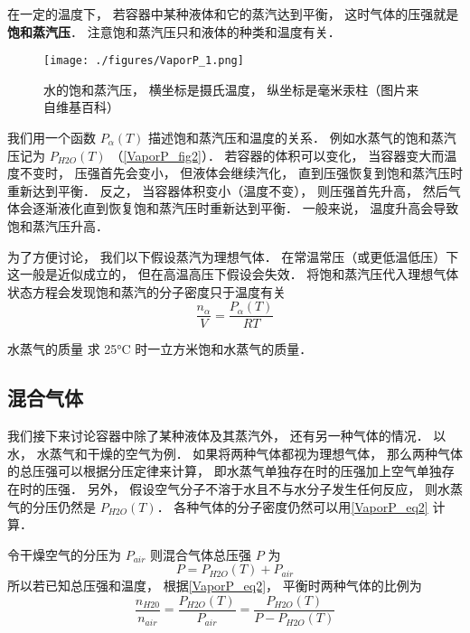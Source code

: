 

在一定的温度下， 若容器中某种液体和它的蒸汽达到平衡， 这时气体的压强就是\textbf{饱和蒸汽压}． 注意饱和蒸汽压只和液体的种类和温度有关．

\begin{figure}[ht]
\centering
\texttt{[image: ./figures/VaporP\_1.png]}
\caption{水的饱和蒸汽压， 横坐标是摄氏温度， 纵坐标是毫米汞柱（图片来自维基百科）} \label{VaporP_fig2}
\end{figure}

我们用一个函数 $P_\alpha(T)$ 描述饱和蒸汽压和温度的关系． 例如水蒸气的饱和蒸汽压记为 $P_{H2O}(T)$ （\autoref{VaporP_fig2}）． 若容器的体积可以变化， 当容器变大而温度不变时， 压强首先会变小， 但液体会继续汽化， 直到压强恢复到饱和蒸汽压时重新达到平衡． 反之， 当容器体积变小（温度不变）， 则压强首先升高，  然后气体会逐渐液化直到恢复饱和蒸汽压时重新达到平衡． 一般来说， 温度升高会导致饱和蒸汽压升高．

为了方便讨论， 我们以下假设蒸汽为理想气体． 在常温常压（或更低温低压）下这一般是近似成立的， 但在高温高压下假设会失效． 将饱和蒸汽压代入理想气体状态方程会发现饱和蒸汽的分子密度只于温度有关
\begin{equation}\label{VaporP_eq2}
\frac{n_\alpha}{V}  = \frac{P_\alpha(T)}{R T}
\end{equation}

\begin{exercise}{水蒸气的质量}
求 25°C 时一立方米饱和水蒸气的质量．
\end{exercise}

\subsection{混合气体}

我们接下来讨论容器中除了某种液体及其蒸汽外， 还有另一种气体的情况． 以水， 水蒸气和干燥的空气为例． 如果将两种气体都视为理想气体， 那么两种气体的总压强可以根据分压定律来计算， 即水蒸气单独存在时的压强加上空气单独存在时的压强． 另外， 假设空气分子不溶于水且不与水分子发生任何反应， 则水蒸气的分压仍然是 $P_{H2O}(T)$． 各种气体的分子密度仍然可以用\autoref{VaporP_eq2} 计算．

令干燥空气的分压为 $P_{air}$ 则混合气体总压强 $P$ 为
\begin{equation}
P = P_{H2O}(T) + P_{air}
\end{equation}
所以若已知总压强和温度， 根据\autoref{VaporP_eq2}， 平衡时两种气体的比例为
\begin{equation}\label{VaporP_eq1}
\frac{n_{H20}}{n_{air}} = \frac{P_{H2O}(T)}{P_{air}} = \frac{P_{H2O}(T)}{P - P_{H2O}(T)}
\end{equation}

